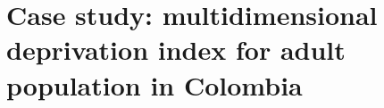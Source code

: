 \documentclass[a4paper, 11pt]{article}
\begin{document}








    










\section{Case study: multidimensional deprivation index for adult population in Colombia}
\end{document}
